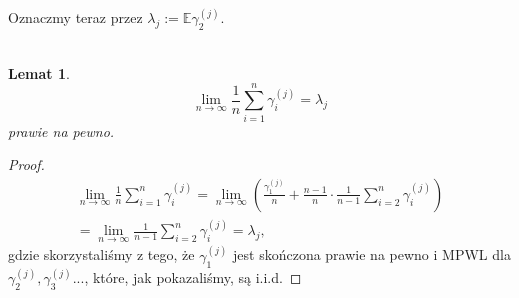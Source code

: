 \documentclass[a4paper]{article}
\theoremstyle{defn}
\theoremstyle{theorem}
\theoremstyle{lemma}
\newtheorem{lemma}[defn]{Lemat}
\theoremstyle{cor}
\theoremstyle{fact}
\begin{document}
Oznaczmy teraz przez $\lambda_j := \mathbb{E}\gamma_2^{(j)}$.\\\\
\begin{lemma}\label{lemma2.5.11}
$$\lim\limits_{n \to \infty} \frac{1}{n} \sum\limits_{i = 1}^n \gamma_i^{(j)} = \lambda_j$$
prawie na pewno.
\end{lemma}
\begin{proof}
\begin{align*}
    \lim\limits_{n \to \infty} \frac{1}{n} \sum\limits_{i = 1}^n \gamma_i^{(j)} = 
    \lim\limits_{n \to \infty} \left(\frac{\gamma_1^{(j)}}{n} + \frac{n-1}{n}\cdot\frac{1}{n-1} \sum\limits_{i = 2}^n \gamma_i^{(j)}\right)\\
    = \lim\limits_{n \to \infty} \frac{1}{n-1} \sum\limits_{i = 2}^n \gamma_i^{(j)} = \lambda_j,
\end{align*}
gdzie skorzystaliśmy z tego, że $\gamma_1^{(j)}$ jest skończona prawie na pewno i MPWL dla $\gamma_2^{(j)}, \gamma_3^{(j)}...$, które, jak pokazaliśmy, są i.i.d.
\end{proof}
\end{document}
